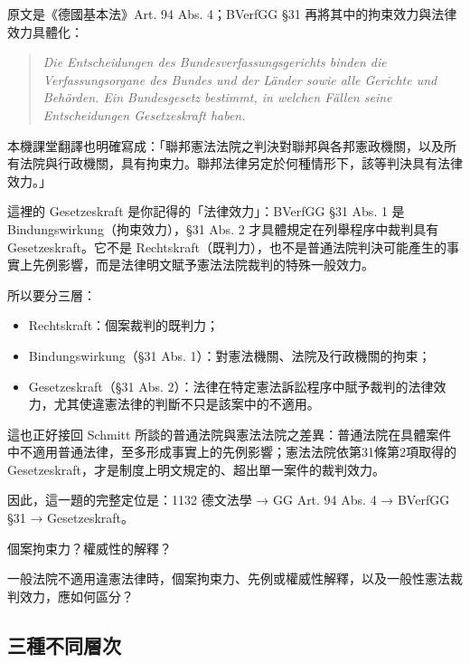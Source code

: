 原文是《德國基本法》Art. 94 Abs. 4；BVerfGG §31 再將其中的拘束效力與法律效力具體化：

\begin{quote}
\emph{Die Entscheidungen des Bundesverfassungsgerichts binden die Verfassungsorgane des Bundes und der Länder sowie alle Gerichte und Behörden. Ein Bundesgesetz bestimmt, in welchen Fällen seine Entscheidungen Gesetzeskraft haben.}
\end{quote}

本機課堂翻譯也明確寫成：「聯邦憲法法院之判決對聯邦與各邦憲政機關，以及所有法院與行政機關，具有拘束力。聯邦法律另定於何種情形下，該等判決具有法律效力。」

這裡的 Gesetzeskraft 是你記得的「法律效力」：BVerfGG §31 Abs. 1 是 Bindungswirkung（拘束效力），§31 Abs. 2 才具體規定在列舉程序中裁判具有 Gesetzeskraft。它不是 Rechtskraft（既判力），也不是普通法院判決可能產生的事實上先例影響，而是法律明文賦予憲法法院裁判的特殊一般效力。

所以要分三層：

\begin{itemize}
\tightlist
\item
  Rechtskraft：個案裁判的既判力；
\item
  Bindungswirkung（§31 Abs. 1）：對憲法機關、法院及行政機關的拘束；
\item
  Gesetzeskraft（§31 Abs. 2）：法律在特定憲法訴訟程序中賦予裁判的法律效力，尤其使違憲法律的判斷不只是該案中的不適用。
\end{itemize}

這也正好接回 Schmitt 所談的普通法院與憲法法院之差異：普通法院在具體案件中不適用普通法律，至多形成事實上的先例影響；憲法法院依第31條第2項取得的 Gesetzeskraft，才是制度上明文規定的、超出單一案件的裁判效力。

因此，這一題的完整定位是：1132 德文法學 → GG Art. 94 Abs. 4 → BVerfGG §31 → Gesetzeskraft。


\begin{qaprompt}
個案拘束力？權威性的解釋？
\end{qaprompt}

\begin{qaquestion}
一般法院不適用違憲法律時，個案拘束力、先例或權威性解釋，以及一般性憲法裁判效力，應如何區分？
\end{qaquestion}

\subsection{三種不同層次}


